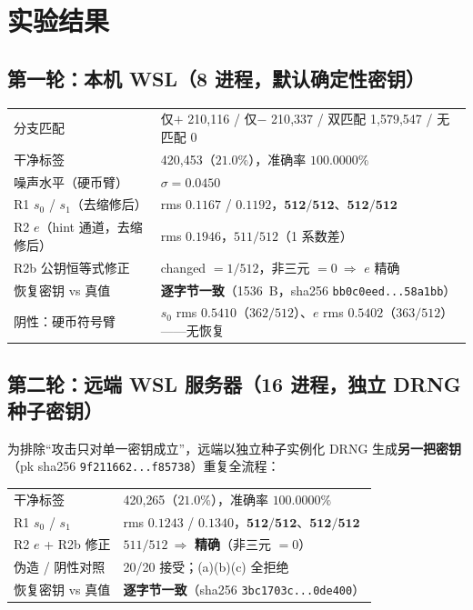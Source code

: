 \documentclass[UTF8,11pt,a4paper]{ctexart}
\newcommand{\code}[1]{\texttt{\small #1}}
\begin{document}
\section{实验结果}

\subsection{第一轮：本机 WSL（8 进程，默认确定性密钥）}

\begin{center}\small
\begin{tabular}{@{}ll@{}}
\toprule
分支匹配 & 仅$+$ 210{,}116 / 仅$-$ 210{,}337 / 双匹配 1{,}579{,}547 / 无匹配 0 \\
干净标签 & 420{,}453（$21.0\%$），准确率 $\mathbf{100.0000\%}$ \\
噪声水平（硬币臂） & $\sigma=0.0450$ \\
R1 $s_0$ / $s_1$（去缩修后） & rms $0.1167$ / $0.1192$，$\mathbf{512/512}$、$\mathbf{512/512}$ \\
R2 $e$（hint 通道，去缩修后） & rms $0.1946$，$511/512$（1 系数差） \\
R2b 公钥恒等式修正 & changed $=1/512$，非三元 $=0\ \Rightarrow$ $e$ 精确 \\
恢复密钥 vs 真值 & \textbf{逐字节一致}（1536~B，sha256 \code{bb0c0eed...58a1bb}） \\
阴性：硬币符号臂 & $s_0$ rms $0.5410$（$362/512$）、$e$ rms $0.5402$（$363/512$）——无恢复 \\
\bottomrule
\end{tabular}
\end{center}

\subsection{第二轮：远端 WSL 服务器（16 进程，独立 DRNG 种子密钥）}

为排除``攻击只对单一密钥成立''，远端以独立种子实例化 DRNG 生成\textbf{另一把密钥}
（pk sha256 \code{9f211662...f85738}）重复全流程：

\begin{center}\small
\begin{tabular}{@{}ll@{}}
\toprule
干净标签 & 420{,}265（$21.0\%$），准确率 $\mathbf{100.0000\%}$ \\
R1 $s_0$ / $s_1$ & rms $0.1243$ / $0.1340$，$\mathbf{512/512}$、$\mathbf{512/512}$ \\
R2 $e$ + R2b 修正 & $511/512\ \Rightarrow$ \textbf{精确}（非三元 $=0$） \\
伪造 / 阴性对照 & 20/20 接受；(a)(b)(c) 全拒绝 \\
恢复密钥 vs 真值 & \textbf{逐字节一致}（sha256 \code{3bc1703c...0de400}） \\
\bottomrule
\end{tabular}
\end{center}
\end{document}
